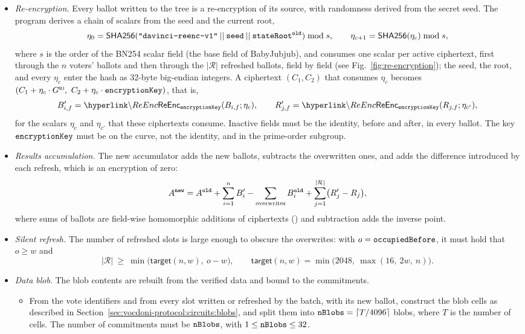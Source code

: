 \begin{itemize}
		\item \emph{Re-encryption.} Every ballot written to the tree is a re-encryption of its source, with randomness derived from the secret seed. The program derives a chain of scalars from the seed and the current root,
			\[ \eta_0 = {\sf{SHA256}}(\texttt{"davinci-reenc-v1"} \:||\: \texttt{seed} \:||\: \texttt{stateRoot}^\texttt{old}) \bmod s, \qquad \eta_{c+1} = {\sf{SHA256}}(\eta_c) \bmod s, \]
		where $s$ is the order of the BN254 scalar field (the base field of BabyJubjub), and consumes one scalar per active ciphertext, first through the $n$ voters' ballots and then through the $|\mathcal{R}|$ refreshed ballots, field by field (see Fig.~\ref{fig:re-encryption}); the seed, the root, and every $\eta_c$ enter the hash as 32-byte big-endian integers. A ciphertext $(C_1, C_2)$ that consumes $\eta_c$ becomes $(C_1 + \eta_c \cdot {G}^{\text{\tiny \sf BJ}},\ C_2 + \eta_c \cdot \texttt{encryptionKey})$, that is,
			\[B'_{i,f} = \hlget{\ReEnc}_{\epk}(B_{i,f}; \eta_c), \qquad R'_{j,f} = \hlget{\ReEnc}_{\epk}(R_{j,f}; \eta_{c'}),\]
			for the scalars $\eta_c$ and $\eta_{c'}$ that these ciphertexts consume.
		Inactive fields must be the identity, before and after, in every ballot. The key $\texttt{encryptionKey}$ must be on the curve, not the identity, and in the prime-order subgroup.
		\item \emph{Results accumulation.} The new accumulator adds the new ballots, subtracts the overwritten ones, and adds the difference introduced by each refresh, which is an encryption of zero:
			\[A^\texttt{new} = A^\texttt{old} + \sum_{i=1}^{n} B'_i - \sum_{\text{overwrites}} B^\texttt{old}_i + \sum_{j=1}^{|\mathcal{R}|} \bigl(R'_j - R_j\bigr),\]
		where sums of ballots are field-wise homomorphic additions of ciphertexts (\hlget{\EncAdd}) and subtraction adds the inverse point.
		\item \emph{Silent refresh.} The number of refreshed slots is large enough to obscure the overwrites: with $o = \texttt{occupiedBefore}$, it must hold that $o \ge w$ and
			\[ |\mathcal{R}| \ \ge\ \min\bigl(\mathsf{target}(n, w),\ o - w\bigr), \qquad \mathsf{target}(n, w) = \min\bigl(2048,\ \max(16,\ 2w,\ n)\bigr).\]
		\item \emph{Data blob}. The blob contents are rebuilt from the verified data and bound to the commitments.
		\begin{itemize}
			\item From the vote identifiers and from every slot written or refreshed by the batch, with its new ballot, construct the blob cells as described in Section~\ref{sec:vocdoni-protocol:circuits:blobs}, and split them into $\texttt{nBlobs} = \lceil T / 4096 \rceil$ blobs, where $T$ is the number of cells. The number of commitments must be $\texttt{nBlobs}$, with $1 \le \texttt{nBlobs} \le 32$.

\end{itemize}
\end{itemize}

